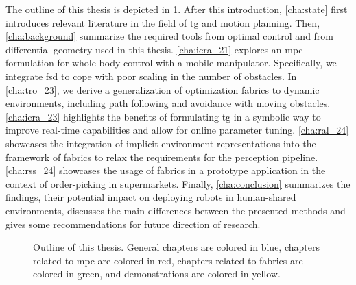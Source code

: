 The outline of this thesis is depicted in \cref{fig:outline}.
After this introduction, \cref{cha:state} first introduces
relevant literature in the field of \ac{tg}
and motion planning.
Then, \cref{cha:background} summarize the required tools
from optimal control and from differential geometry used in this thesis.
\cref{cha:icra_21} explores an \ac{mpc}
formulation for whole body control
with a mobile manipulator. Specifically, we integrate
\acl{fsd} to cope with poor scaling in the number of
obstacles.
In \cref{cha:tro_23}, we derive a
generalization of optimization fabrics to dynamic
environments, including path following and avoidance with
moving obstacles.
\cref{cha:icra_23} highlights the benefits of
formulating \ac{tg} in a symbolic way to
improve real-time capabilities and allow for online
parameter tuning.
\cref{cha:ral_24} showcases the integration of
implicit environment representations into the framework of
\ac{fabrics} to relax the requirements for the
perception pipeline.
\cref{cha:rss_24} showcases the 
usage of \ac{fabrics} in a prototype application in the
context of order-picking in supermarkets.
Finally,
\cref{cha:conclusion} summarizes the findings, their potential impact
on deploying robots in human-shared environments, discusses
the main differences between the presented methods and gives some
recommendations for future direction of research.
%
\begin{figure}[ht]
  \begin{center}
    
  \end{center}
  \caption{Outline of this thesis. General chapters are
  colored in blue, chapters related to \ac{mpc} are colored
  in red, chapters related to \ac{fabrics} are colored in 
  green, and demonstrations are colored in yellow.}
  \label{fig:outline}
\end{figure}
%


